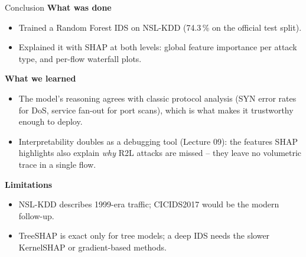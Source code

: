 \documentclass[11pt,aspectratio=169]{beamer}
\begin{document}
\begin{frame}{Conclusion}
\small
\textbf{What was done}
\begin{itemize}\itemsep2pt
  \item Trained a Random Forest IDS on NSL-KDD (74.3\,\% on the official test split).
  \item Explained it with SHAP at both levels: global feature importance per
        attack type, and per-flow waterfall plots.
\end{itemize}

\vspace{0.5em}
\textbf{What we learned}
\begin{itemize}\itemsep2pt
  \item The model's reasoning agrees with classic protocol analysis (SYN error
        rates for DoS, service fan-out for port scans), which is what makes it
        trustworthy enough to deploy.
  \item Interpretability doubles as a debugging tool (Lecture 09): the features
        SHAP highlights also explain \emph{why} R2L attacks are missed -- they leave
        no volumetric trace in a single flow.
\end{itemize}

\vspace{0.5em}
\textbf{Limitations}
\begin{itemize}\itemsep2pt
  \item NSL-KDD describes 1999-era traffic; CICIDS2017 would be the modern follow-up.
  \item TreeSHAP is exact only for tree models; a deep IDS needs the slower
        KernelSHAP or gradient-based methods.
\end{itemize}
\end{frame}
\end{document}
